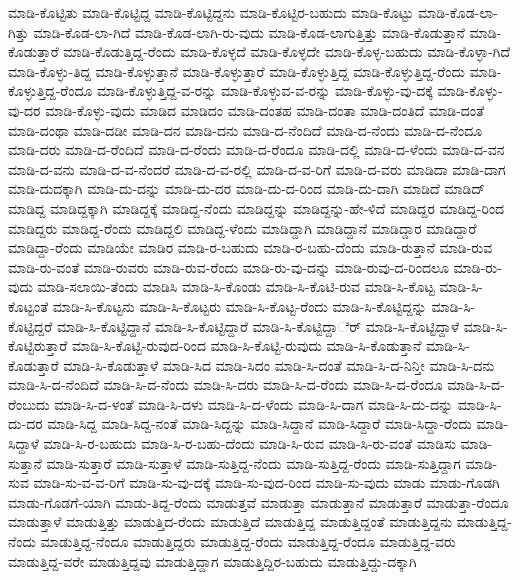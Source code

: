 ಮಾಡಿ-ಕೊಟ್ಟಿತು
ಮಾಡಿ-ಕೊಟ್ಟಿದ್ದ
ಮಾಡಿ-ಕೊಟ್ಟಿದ್ದನು
ಮಾಡಿ-ಕೊಟ್ಟಿರ-ಬಹುದು
ಮಾಡಿ-ಕೊಟ್ಟು
ಮಾಡಿ-ಕೊಡ-ಲಾ-ಗಿತ್ತು
ಮಾಡಿ-ಕೊಡ-ಲಾ-ಗಿದೆ
ಮಾಡಿ-ಕೊಡ-ಲಾಗಿ-ರು-ವುದು
ಮಾಡಿ-ಕೊಡ-ಲಾಗುತ್ತಿತ್ತು
ಮಾಡಿ-ಕೊಡುತ್ತಾನೆ
ಮಾಡಿ-ಕೊಡುತ್ತಾರೆ
ಮಾಡಿ-ಕೊಡುತ್ತಿದ್ದ-ರೆಂದು
ಮಾಡಿ-ಕೊಳ್ಳದೆ
ಮಾಡಿ-ಕೊಳ್ಳದೇ
ಮಾಡಿ-ಕೊಳ್ಳ-ಬಹುದು
ಮಾಡಿ-ಕೊಳ್ಳಾ-ಗಿದೆ
ಮಾಡಿ-ಕೊಳ್ಳು-ತಿದ್ದ
ಮಾಡಿ-ಕೊಳ್ಳುತ್ತಾನೆ
ಮಾಡಿ-ಕೊಳ್ಳುತ್ತಾರೆ
ಮಾಡಿ-ಕೊಳ್ಳುತ್ತಿದ್ದ
ಮಾಡಿ-ಕೊಳ್ಳುತ್ತಿದ್ದ-ರೆಂದು
ಮಾಡಿ-ಕೊಳ್ಳುತ್ತಿದ್ದ-ರೆಂದೂ
ಮಾಡಿ-ಕೊಳ್ಳುತ್ತಿದ್ದ-ವ-ರನ್ನು
ಮಾಡಿ-ಕೊಳ್ಳುವ-ವ-ರನ್ನು
ಮಾಡಿ-ಕೊಳ್ಳು-ವು-ದಕ್ಕೆ
ಮಾಡಿ-ಕೊಳ್ಳು-ವು-ದರ
ಮಾಡಿ-ಕೊಳ್ಳು-ವುದು
ಮಾಡಿದ
ಮಾಡಿದಂ
ಮಾಡಿ-ದಂತಹ
ಮಾಡಿ-ದಂತಾ
ಮಾಡಿ-ದಂತಿದೆ
ಮಾಡಿ-ದಂತೆ
ಮಾಡಿ-ದಂಥಾ
ಮಾಡಿ-ದಡೀ
ಮಾಡಿ-ದನ
ಮಾಡಿ-ದನು
ಮಾಡಿ-ದ-ನೆಂದಿದೆ
ಮಾಡಿ-ದ-ನೆಂದು
ಮಾಡಿ-ದ-ನೆಂದೂ
ಮಾಡಿ-ದರು
ಮಾಡಿ-ದ-ರೆಂದಿದೆ
ಮಾಡಿ-ದ-ರೆಂದು
ಮಾಡಿ-ದ-ರೆಂದೂ
ಮಾಡಿ-ದಲ್ಲಿ
ಮಾಡಿ-ದ-ಳೆಂದು
ಮಾಡಿ-ದ-ವನ
ಮಾಡಿ-ದ-ವನು
ಮಾಡಿ-ದ-ವ-ನೆಂದರೆ
ಮಾಡಿ-ದ-ವ-ರಲ್ಲಿ
ಮಾಡಿ-ದ-ವ-ರಿಗೆ
ಮಾಡಿ-ದ-ವರು
ಮಾಡಿದಾ
ಮಾಡಿ-ದಾಗ
ಮಾಡಿ-ದುದಕ್ಕಾಗಿ
ಮಾಡಿ-ದು-ದನ್ನು
ಮಾಡಿ-ದು-ದರ
ಮಾಡಿ-ದು-ದ-ರಿಂದ
ಮಾಡಿ-ದು-ದಾಗಿ
ಮಾಡಿದೆ
ಮಾಡಿದ್
ಮಾಡಿದ್ದ
ಮಾಡಿದ್ದಕ್ಕಾಗಿ
ಮಾಡಿದ್ದಕ್ಕೆ
ಮಾಡಿದ್ದ-ನೆಂದು
ಮಾಡಿದ್ದನ್ನು
ಮಾಡಿದ್ದನ್ನು-ಹೇ-ಳಿದೆ
ಮಾಡಿದ್ದರ
ಮಾಡಿದ್ದ-ರಿಂದ
ಮಾಡಿದ್ದರು
ಮಾಡಿದ್ದ-ರೆಂದು
ಮಾಡಿದ್ದಲಿ
ಮಾಡಿದ್ದ-ಳೆಂದು
ಮಾಡಿದ್ದಾಗಿ
ಮಾಡಿದ್ದಾನೆ
ಮಾಡಿದ್ದಾರ
ಮಾಡಿದ್ದಾರೆ
ಮಾಡಿದ್ದಾ-ರೆಂದು
ಮಾಡಿಯೇ
ಮಾಡಿರ
ಮಾಡಿ-ರ-ಬಹುದು
ಮಾಡಿ-ರ-ಬಹು-ದೆಂದು
ಮಾಡಿ-ರುತ್ತಾನೆ
ಮಾಡಿ-ರುವ
ಮಾಡಿ-ರು-ವಂತೆ
ಮಾಡಿ-ರುವರು
ಮಾಡಿ-ರುವ-ರೆಂದು
ಮಾಡಿ-ರು-ವು-ದನ್ನು
ಮಾಡಿ-ರುವು-ದ-ರಿಂದಲೂ
ಮಾಡಿ-ರು-ವುದು
ಮಾಡಿ-ಸಲಾಯಿ-ತೆಂದು
ಮಾಡಿಸಿ
ಮಾಡಿ-ಸಿ-ಕೊಂಡು
ಮಾಡಿ-ಸಿ-ಕೊಟಿ-ರುವ
ಮಾಡಿ-ಸಿ-ಕೊಟ್ಟ
ಮಾಡಿ-ಸಿ-ಕೊಟ್ಟಂತೆ
ಮಾಡಿ-ಸಿ-ಕೊಟ್ಟನು
ಮಾಡಿ-ಸಿ-ಕೊಟ್ಟರು
ಮಾಡಿ-ಸಿ-ಕೊಟ್ಟ-ರೆಂದು
ಮಾಡಿ-ಸಿ-ಕೊಟ್ಟಿದ್ದನ್ನು
ಮಾಡಿ-ಸಿ-ಕೊಟ್ಟಿದ್ದರೆ
ಮಾಡಿ-ಸಿ-ಕೊಟ್ಟಿದ್ದಾನೆ
ಮಾಡಿ-ಸಿ-ಕೊಟ್ಟಿದ್ದಾರೆ
ಮಾಡಿ-ಸಿ-ಕೊಟ್ಟಿದ್ದಾರ್ೆ
ಮಾಡಿ-ಸಿ-ಕೊಟ್ಟಿದ್ದಾಳೆ
ಮಾಡಿ-ಸಿ-ಕೊಟ್ಟಿರುತ್ತಾರೆ
ಮಾಡಿ-ಸಿ-ಕೊಟ್ಟಿ-ರುವುದ-ರಿಂದ
ಮಾಡಿ-ಸಿ-ಕೊಟ್ಟಿ-ರುವುದು
ಮಾಡಿ-ಸಿ-ಕೊಡುತ್ತಾನೆ
ಮಾಡಿ-ಸಿ-ಕೊಡುತ್ತಾರೆ
ಮಾಡಿ-ಸಿ-ಕೊಡುತ್ತಾಳೆ
ಮಾಡಿ-ಸಿದ
ಮಾಡಿ-ಸಿದಂ
ಮಾಡಿ-ಸಿ-ದಂತೆ
ಮಾಡಿ-ಸಿ-ದ-ನಿನ್ತೀ
ಮಾಡಿ-ಸಿ-ದನು
ಮಾಡಿ-ಸಿ-ದ-ನೆಂದಿದೆ
ಮಾಡಿ-ಸಿ-ದ-ನೆಂದು
ಮಾಡಿ-ಸಿ-ದರು
ಮಾಡಿ-ಸಿ-ದ-ರೆಂದು
ಮಾಡಿ-ಸಿ-ದ-ರೆಂದೂ
ಮಾಡಿ-ಸಿ-ದ-ರೆಂಬುದು
ಮಾಡಿ-ಸಿ-ದ-ಳಂತೆ
ಮಾಡಿ-ಸಿ-ದಳು
ಮಾಡಿ-ಸಿ-ದ-ಳೆಂದು
ಮಾಡಿ-ಸಿ-ದಾಗ
ಮಾಡಿ-ಸಿ-ದು-ದನ್ನು
ಮಾಡಿ-ಸಿ-ದು-ದರ
ಮಾಡಿ-ಸಿದ್ದ
ಮಾಡಿ-ಸಿದ್ದ-ನಂತೆ
ಮಾಡಿ-ಸಿದ್ದನ್ನು
ಮಾಡಿ-ಸಿದ್ದಾನೆ
ಮಾಡಿ-ಸಿದ್ದಾರೆ
ಮಾಡಿ-ಸಿದ್ದಾ-ರೆಂದು
ಮಾಡಿ-ಸಿದ್ದಾಳೆ
ಮಾಡಿ-ಸಿ-ರ-ಬಹುದು
ಮಾಡಿ-ಸಿ-ರ-ಬಹು-ದೆಂದು
ಮಾಡಿ-ಸಿ-ರುವ
ಮಾಡಿ-ಸಿ-ರು-ವಂತೆ
ಮಾಡಿಸು
ಮಾಡಿ-ಸುತ್ತಾನೆ
ಮಾಡಿ-ಸುತ್ತಾರೆ
ಮಾಡಿ-ಸುತ್ತಾಳೆ
ಮಾಡಿ-ಸುತ್ತಿದ್ದ-ನೆಂದು
ಮಾಡಿ-ಸುತ್ತಿದ್ದ-ರೆಂದು
ಮಾಡಿ-ಸುತ್ತಿದ್ದಾಗ
ಮಾಡಿ-ಸುವ
ಮಾಡಿ-ಸು-ವ-ವ-ರಿಗೆ
ಮಾಡಿ-ಸು-ವು-ದಕ್ಕೆ
ಮಾಡಿ-ಸು-ವುದ-ರಿಂದ
ಮಾಡಿ-ಸು-ವುದು
ಮಾಡು
ಮಾಡು-ಗೊಡಗಿ
ಮಾಡು-ಗೊಡಗೆ-ಯಾಗಿ
ಮಾಡು-ತಿದ್ದ-ರೆಂದು
ಮಾಡುತ್ತವೆ
ಮಾಡುತ್ತಾ
ಮಾಡುತ್ತಾನೆ
ಮಾಡುತ್ತಾರೆ
ಮಾಡುತ್ತಾ-ರೆಂದೂ
ಮಾಡುತ್ತಾಳೆ
ಮಾಡುತ್ತಿತ್ತು
ಮಾಡುತ್ತಿದ-ರೆಂದು
ಮಾಡುತ್ತಿದೆ
ಮಾಡುತ್ತಿದ್ದ
ಮಾಡುತ್ತಿದ್ದಂತೆ
ಮಾಡುತ್ತಿದ್ದನು
ಮಾಡುತ್ತಿದ್ದ-ನೆಂದು
ಮಾಡುತ್ತಿದ್ದ-ನೆಂದೂ
ಮಾಡುತ್ತಿದ್ದರು
ಮಾಡುತ್ತಿದ್ದ-ರೆಂದು
ಮಾಡುತ್ತಿದ್ದ-ರೆಂದೂ
ಮಾಡುತ್ತಿದ್ದ-ವರು
ಮಾಡುತ್ತಿದ್ದ-ವರೇ
ಮಾಡುತ್ತಿದ್ದವು
ಮಾಡುತ್ತಿದ್ದಾಗ
ಮಾಡುತ್ತಿದ್ದಿರ-ಬಹುದು
ಮಾಡುತ್ತಿದ್ದು-ದಕ್ಕಾಗಿ
